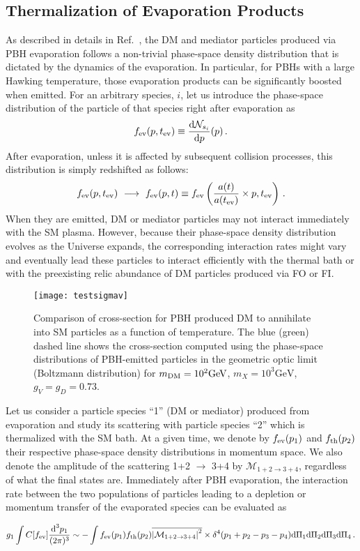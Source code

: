 \documentclass[aps,prd,reprint,twocolumn,preprintnumbers,floatfix,nofootinbib]{revtex4-1}
\newcommand{\be}{\begin{equation}}
\newcommand{\ee}{\end{equation}}
\newcommand{\dd}{\text{d}}
\newcommand{\mDM}{m_{\rm DM}}
\begin{document}
\subsection{Thermalization of Evaporation Products}

As described in details in Ref.~\cite{paper1}, the DM and mediator particles produced via PBH evaporation follows a non-trivial phase-space density distribution that is dictated by the dynamics of the evaporation. In particular, for PBHs with a large Hawking temperature, those evaporation products can be significantly boosted when emitted. For an arbitrary species, $i$, let us introduce the phase-space distribution of the particle of that species right after evaporation as
\be
f_{\rm ev}(p, t_{\rm ev})\equiv \frac{\dd \mathcal N_{s_i}}{\dd p}(p)\,.
\ee
After evaporation, unless it is affected by subsequent collision processes, this distribution is simply redshifted as follows:
\be
f_{\rm ev}(p, t_{\rm ev})\ \longrightarrow\ f_{\rm ev}(p, t)\equiv f_{\rm ev}\left(\frac{a(t)}{a(t_{\rm ev})}\times p,t_{\rm ev}\right)\,.
\ee
When they are emitted, DM or mediator particles may not interact immediately with the SM plasma. However, because their phase-space density distribution evolves as the Universe expands, the corresponding interaction rates might vary and eventually lead these particles to interact efficiently with the thermal bath or with the preexisting relic abundance of DM particles produced via FO or FI. 


\begin{figure}[t!]
 \centering
 \texttt{[image: testsigmav]}
 \caption{\label{fig:test_sigma}\footnotesize Comparison of cross-section for PBH produced DM to annihilate into SM particles as a function of temperature. The blue (green) dashed line shows the cross-section   computed using the phase-space distributions of PBH-emitted  particles  in the geometric optic limit (Boltzmann distribution) for $\mDM=10^2\mathrm{GeV}$, $m_X=10^3\mathrm{GeV}$, $g_V=g_D=0.73$.}
\end{figure}

Let us consider a particle species ``1'' (DM or mediator) produced from evaporation and study its scattering with particle species ``2'' which is thermalized with the SM bath. At a given time, we denote by $f_{\rm ev}(p_1)$ and $f_{\rm th}(p_2)$ their respective phase-space density distributions in momentum space. We also denote the amplitude of the scattering 1+2 $\to$ 3+4 by $\mathcal M_{1+2\to 3+4}$, regardless of what the final states are. Immediately after PBH evaporation, the interaction rate between the two populations of particles leading to a depletion or momentum transfer of the evaporated species can be evaluated as
\begin{widetext}
\be
g_1 \int C[f_{\rm ev}]\frac{\dd^3 p_1}{(2\pi)^3} \sim -\int f_{\rm ev}(p_1)f_{\rm th}(p_2)\overline{\left|\mathcal M_{1+2\to 3+4}\right|^2}\times \delta^4(p_1+p_2-p_3-p_4)\dd\Pi_1\dd\Pi_2\dd\Pi_3\dd\Pi_4\,.
\ee
\end{widetext}
\end{document}
